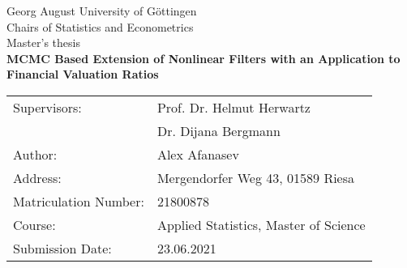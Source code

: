 \begin{titlepage}
	\begin{center}
	\vspace*{4cm}
	{\LARGE Georg August University of Göttingen}\\
	\vskip 1.5cm
	{\large Chairs of Statistics and Econometrics}\\
	\vskip 0.5cm
	{\large Master's thesis}\\
	\vskip 2.0cm
	{\LARGE\textbf{MCMC Based Extension of Nonlinear Filters with an Application to Financial Valuation Ratios}}\\
	\end{center}
\vfill
\vfill
\begin{tabular}{ll}
	Supervisors: & Prof. Dr. Helmut Herwartz \\
	             & Dr. Dijana Bergmann \\
	Author: & Alex Afanasev \\
	Address: & Mergendorfer Weg 43, 01589 Riesa \\
	Matriculation Number: & 21800878 \\
	Course: & Applied Statistics, Master of Science \\
	Submission Date: & 23.06.2021 \\
\end{tabular}
\end{titlepage}
